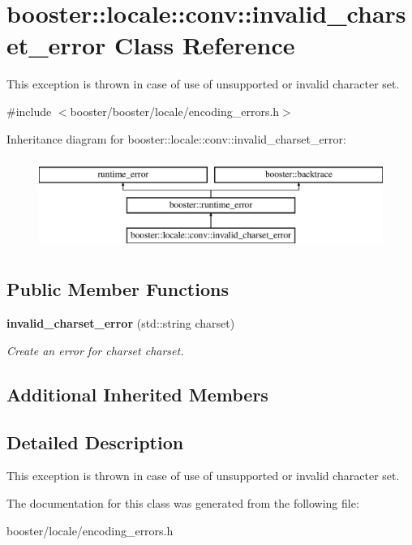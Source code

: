 \section{booster\+:\+:locale\+:\+:conv\+:\+:invalid\+\_\+charset\+\_\+error Class Reference}
\label{classbooster_1_1locale_1_1conv_1_1invalid__charset__error}


This exception is thrown in case of use of unsupported or invalid character set.  




{\ttfamily \#include $<$booster/booster/locale/encoding\+\_\+errors.\+h$>$}

Inheritance diagram for booster\+:\+:locale\+:\+:conv\+:\+:invalid\+\_\+charset\+\_\+error\+:\begin{figure}[H]
\begin{center}
\leavevmode
\includegraphics[height=3.000000cm]{classbooster_1_1locale_1_1conv_1_1invalid__charset__error}
\end{center}
\end{figure}
\subsection*{Public Member Functions}
\begin{DoxyCompactItemize}
\item 
{\bf invalid\+\_\+charset\+\_\+error} (std\+::string charset)\label{classbooster_1_1locale_1_1conv_1_1invalid__charset__error_a80039183bc0c89b03e70e832ad7f1477}

\begin{DoxyCompactList}\small\item\em Create an error for charset {\itshape charset}. \end{DoxyCompactList}\end{DoxyCompactItemize}
\subsection*{Additional Inherited Members}


\subsection{Detailed Description}
This exception is thrown in case of use of unsupported or invalid character set. 

The documentation for this class was generated from the following file\+:\begin{DoxyCompactItemize}
\item 
booster/locale/encoding\+\_\+errors.\+h\end{DoxyCompactItemize}

